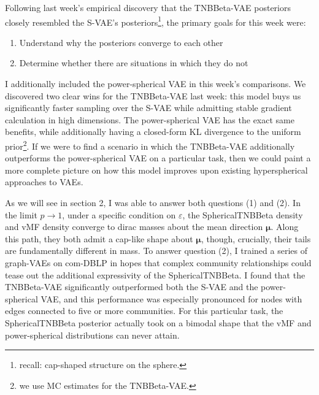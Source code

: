 Following last week's empirical discovery that the TNBBeta-VAE posteriors
closely resembled the S-VAE's posteriors\footnote{recall: cap-shaped structure on the
sphere.}, the primary goals for this week were:
\begin{enumerate}
    \item Understand why the posteriors converge to each other
    \item Determine whether there are situations in which they do not
\end{enumerate}
I additionally included the power-spherical VAE \citep{decao2020powersphericaldistribution}
in this week's comparisons. We discovered two clear wins for the TNBBeta-VAE last week:
this model buys us significantly faster sampling over the S-VAE while admitting stable
gradient calculation in high dimensions. The power-spherical VAE has the exact same benefits,
while additionally having a closed-form KL divergence to the uniform prior\footnote{we use MC estimates for the TNBBeta-VAE.}.
If we were to find a scenario in which the TNBBeta-VAE additionally outperforms the power-spherical
VAE on a particular task, then we could paint a more complete picture on how this model improves
upon existing hyperspherical approaches to VAEs.

As we will see in section 2, I was able to answer both questions (1) and (2). In the limit
$p \to 1$, under a specific condition on $\varepsilon$, the SphericalTNBBeta density and vMF
density converge to dirac masses about the mean direction $\boldsymbol{\mu}$. Along this path,
they both admit a cap-like shape about $\boldsymbol{\mu}$, though, crucially, their tails are
fundamentally different in mass.
To answer question (2), I trained a series of graph-VAEs on com-DBLP \citep{DBLP:journals/corr/abs-1205-6233}
in hopes that complex community relationships could tease out the additional expressivity of
the SphericalTNBBeta. I found that the TNBBeta-VAE significantly outperformed both the S-VAE
and the power-spherical VAE, and this performance was especially pronounced for nodes with
edges connected to five or more communities. For this particular task, the SphericalTNBBeta
posterior actually took on a bimodal shape that the vMF and power-spherical distributions can
never attain.
